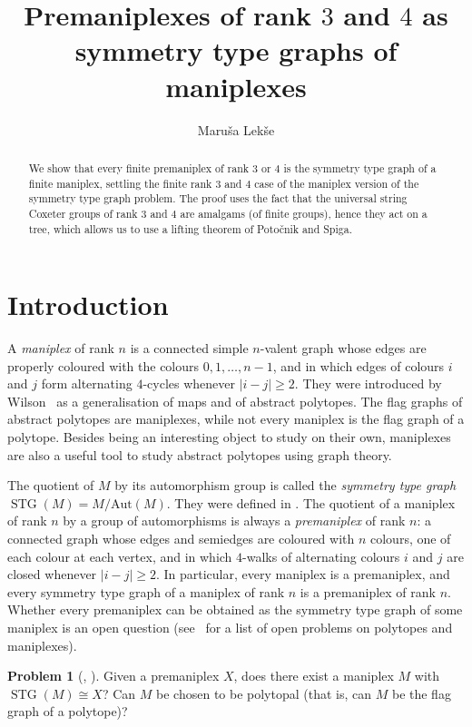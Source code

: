 \documentclass{amsart}
\title{Premaniplexes of rank $3$ and $4$ as symmetry type graphs of maniplexes}
\author{Maru\v{s}a Lek\v{s}e}
\newcommand{\marusa}[1]{\todo[color=red!25]{\textbf{Maru\v{s}a:} #1}}
\theoremstyle{plain}
\theoremstyle{definition}
\newtheorem{problem}[theorem]{Problem}
\theoremstyle{remark}
\newcommand{\Aut}{\mathrm{Aut}}
\DeclareMathOperator{\STG}{STG}
\begin{document}
\begin{abstract}
We show that every finite premaniplex of rank $3$ or $4$ is the symmetry type graph of
a finite maniplex, settling the finite rank $3$ and $4$ case of the maniplex version of 
the symmetry type graph problem. The proof uses the fact that the universal string
 Coxeter groups of
rank $3$ and $4$ are amalgams (of finite groups), hence they act on a tree, 
which allows us to use a
lifting theorem of Potočnik and Spiga.
\end{abstract}

\maketitle

\section{Introduction}
A \emph{maniplex} of rank $n$ is a connected simple $n$-valent graph whose edges 
are properly coloured with the colours
$0,1,\dots,n-1$, and in which edges
of colours $i$ and $j$ form alternating $4$-cycles whenever $|i-j| \ge 2$. 
They were introduced by Wilson~\cite{Wilson2012} as a generalisation of maps
and of abstract polytopes. The flag graphs of abstract polytopes are maniplexes, 
while not every maniplex is the flag graph
of a polytope. Besides being an interesting object to study on their own,
maniplexes are also a useful tool to study abstract polytopes using graph theory. 

The quotient of $M$ by its automorphism group is called the \emph{symmetry type graph}
$\STG(M) = M/\Aut(M)$. They were defined in \cite{CunninghamRioHubardToledo2015}.
The quotient of a maniplex of rank $n$ by a group of automorphisms is always a
\emph{premaniplex} of rank $n$: a connected graph whose edges and semiedges are 
coloured with $n$
colours, one of each colour at each vertex, and in which $4$-walks of alternating colours
 $i$ and $j$ are closed whenever $|i-j|\ge2$. In particular, every maniplex is a premaniplex, 
 and every symmetry type graph 
 of a maniplex of rank $n$
is a premaniplex of rank $n$. Whether every premaniplex can be obtained 
as the symmetry type graph of some maniplex is
 an open question
(see~\cite{CunninghamPellicer2018} for a list of open problems on
polytopes and maniplexes).

\begin{problem}[{\cite[Problem 12]{CunninghamPellicer2018}, \cite{HubardMochan2023}}]\label{prob:main}
	Given a premaniplex $X$, does there exist a maniplex $M$ with $\STG(M)\cong X$?
  Can $M$ be chosen to be polytopal (that is, can $M$ be the flag graph of a polytope)?
\end{problem}
\end{document}
